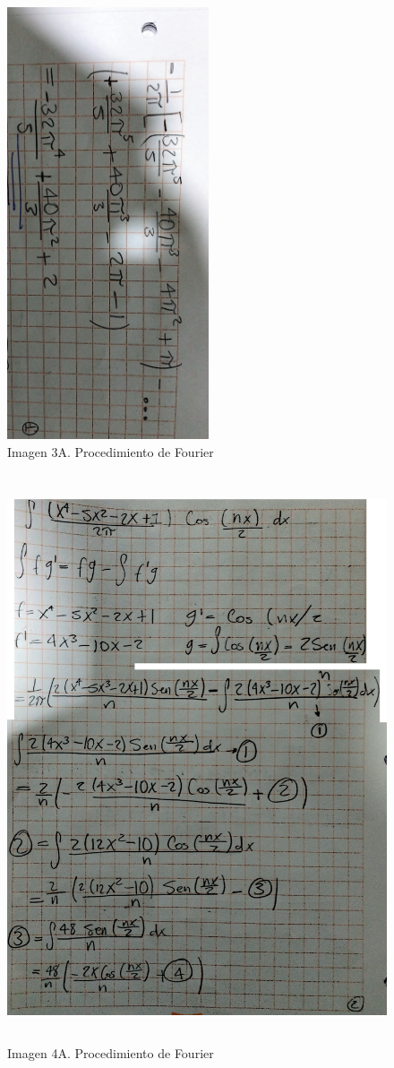 \begin{figure}[H]
	\centering
	\includegraphics[width=2.34606in,height=5.02604in]{media/image54.png}
	\caption{Imagen 3A. Procedimiento de Fourier}
\end{figure}

\begin{figure}[H]
	\centering
	\includegraphics[width=4.84817in,height=6.58854in]{media/image48.png}
	\caption{Imagen 4A. Procedimiento de Fourier}
\end{figure}

